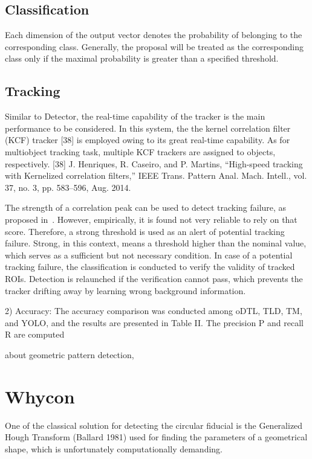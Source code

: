 \documentclass[a4paper]{report}
\begin{document}
\subsection{Classification}
Each dimension of the output vector denotes the probability of
belonging to the corresponding class. Generally, the proposal
will be treated as the corresponding class only if the maximal
probability is greater than a specified threshold.

\subsection{Tracking}
Similar to Detector, the real-time capability of the tracker is
the main performance to be considered. In this system, the the
kernel correlation filter (KCF) tracker [38] is employed owing
to its great real-time capability. As for multiobject tracking task,
multiple KCF trackers are assigned to objects, respectively.
[38] J. Henriques, R. Caseiro, and P. Martins, “High-speed tracking with
Kernelized correlation filters,” IEEE Trans. Pattern Anal. Mach. Intell.,
vol. 37, no. 3, pp. 583–596, Aug. 2014.


The strength of a correlation peak can be used to detect tracking failure, as proposed in~\cite{MOSSE}. However, empirically, it is found not very reliable to rely on that score. Therefore, a strong threshold is used as an alert of potential tracking failure. Strong, in this context, means a threshold higher than the nominal value, which serves as a sufficient but not necessary condition. In case of a potential tracking failure, the classification is conducted to verify the validity of tracked ROIs. Detection is relaunched if the verification cannot pass, which prevents the tracker drifting away by learning wrong background information.



2) Accuracy: The accuracy comparison was conducted
among oDTL, TLD, TM, and YOLO, and the results are presented
in Table II. The precision P and recall R are computed


about geometric pattern detection,

\section{Whycon}
One of the classical solution for detecting the circular fiducial is the Generalized Hough Transform (Ballard 1981) used for finding the parameters of a geometrical shape, which is unfortunately computationally demanding. 
\end{document}
